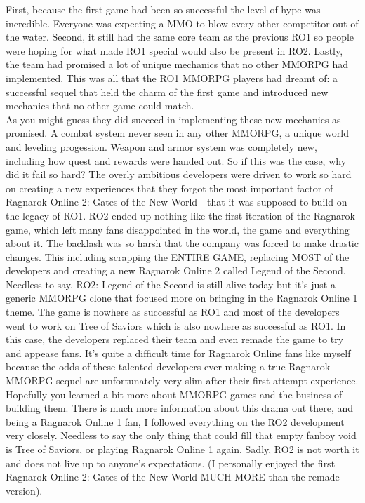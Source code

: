 \documentclass{42-en}
\begin{document}
	First, because the first game had been so successful the level of hype was
	incredible. Everyone was expecting a MMO to blow every other competitor out
	of the water. Second, it still had the same core team as the previous RO1
	so people were hoping for what made RO1 special would also be present in RO2.
	Lastly, the team had promised a lot of unique mechanics that no other MMORPG
	had implemented. This was all that the RO1 MMORPG players had dreamt of: a
	successful sequel that held the charm of the first game and introduced new
	mechanics that no other game could match.\\

	As you might guess they did succeed in implementing these new mechanics as
	promised. A combat system never seen in any other MMORPG, a unique world
	and leveling progession. Weapon and armor system was completely new,
	including how quest and rewards were handed out. So if this was the case,
	why did it fail so hard? The overly ambitious developers were driven to work
	so hard on creating a new experiences that they forgot the most important
	factor of Ragnarok Online 2: Gates of the New World - that it was supposed to
	build on the legacy of RO1. RO2 ended up nothing like the first iteration of
	the Ragnarok game, which left many fans disappointed in the world, the game
	and everything about it. The backlash was so harsh that the company was
	forced to make drastic changes. This including scrapping the ENTIRE GAME,
	replacing MOST of the developers and creating a new Ragnarok Online 2 called
	Legend of the Second.\\

	Needless to say, RO2: Legend of the Second is still alive today but it's just
	a generic MMORPG clone that focused more on bringing in the Ragnarok Online
	1 theme. The game is nowhere as successful as RO1 and most of the developers
	went to work on Tree of Saviors which is also nowhere as successful as RO1.
	In this case, the developers replaced their team and even remade the game to
	try and appease fans. It's quite a difficult time for Ragnarok Online fans
	like myself because the odds of these talented developers ever making a true
	Ragnarok MMORPG sequel are unfortunately very slim after their first attempt
	experience.\\

	Hopefully you learned a bit more about MMORPG games and the business of
	building them. There is much more information about this drama out there, and
	being a Ragnarok Online 1 fan, I followed everything on the RO2 development
	very closely. Needless to say the only thing that could fill that empty
	fanboy void is Tree of Saviors, or playing Ragnarok Online 1 again. Sadly, RO2
	is not worth it and does not live up to anyone's expectations. (I personally
	enjoyed the first Ragnarok Online 2: Gates of the New World MUCH MORE than
	the remade version).\\
\end{document}

